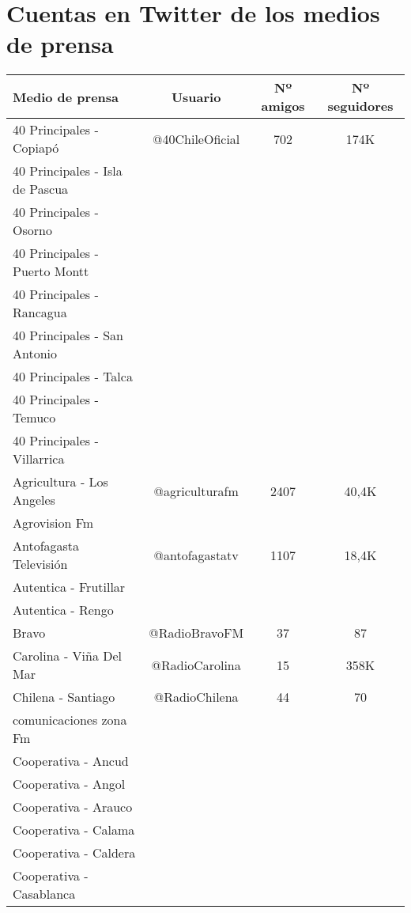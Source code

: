 \section{Cuentas en Twitter de los medios de prensa}

\begin{center}
	\centering
		\begin{longtable}{| l | c | c | c |}
		\hline
			Medio de prensa    & Usuario  & Nº amigos & Nº seguidores \\ \hline	
40 Principales - Copiapó	&	@40ChileOficial	&	702	&	174K	\\ \hline
40 Principales - Isla de Pascua	&		&		&		\\ \hline
40 Principales - Osorno	&		&		&		\\ \hline
40 Principales - Puerto Montt	&		&		&		\\ \hline
40 Principales - Rancagua	&		&		&		\\ \hline
40 Principales - San Antonio	&		&		&		\\ \hline
40 Principales - Talca	&		&		&		\\ \hline
40 Principales - Temuco	&		&		&		\\ \hline
40 Principales - Villarrica	&		&		&		\\ \hline
Agricultura - Los Angeles	&	@agriculturafm	&	2407	&	40,4K	\\ \hline
Agrovision Fm	&		&		&		\\ \hline
Antofagasta Televisión	&	@antofagastatv	&	1107	&	18,4K	\\ \hline
Autentica - Frutillar	&		&		&		\\ \hline
Autentica - Rengo	&		&		&		\\ \hline
Bravo	&	@RadioBravoFM	&	37	&	87	\\ \hline
Carolina - Viña Del Mar	&	@RadioCarolina	&	15	&	358K	\\ \hline
Chilena - Santiago	&	@RadioChilena	&	44	&	70	\\ \hline
comunicaciones zona Fm	&		&		&		\\ \hline
Cooperativa - Ancud	&		&		&		\\ \hline
Cooperativa - Angol	&		&		&		\\ \hline
Cooperativa - Arauco	&		&		&		\\ \hline
Cooperativa - Calama	&		&		&		\\ \hline
Cooperativa - Caldera	&		&		&		\\ \hline
Cooperativa - Casablanca	&		&		&		\\ \hline

\end{longtable}
\end{center}
